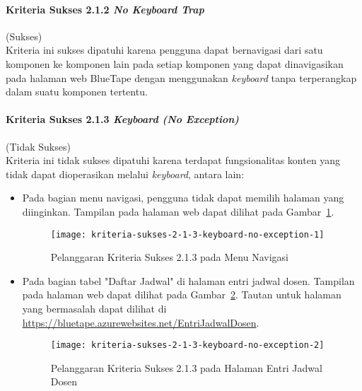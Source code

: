 \paragraph{Kriteria Sukses 2.1.2 \textit{No Keyboard Trap}}
\label{par:kepatuhan_bluetape_kriteria_sukses_2.1.2}
(Sukses)\\

Kriteria ini sukses dipatuhi karena pengguna dapat bernavigasi dari satu komponen ke komponen lain pada setiap komponen yang dapat dinavigasikan pada halaman web BlueTape dengan menggunakan \textit{keyboard} tanpa terperangkap dalam suatu komponen tertentu.

\paragraph{Kriteria Sukses 2.1.3 \textit{Keyboard (No Exception)}}
\label{par:kepatuhan_bluetape_kriteria_sukses_2.1.3}
(Tidak Sukses)\\

Kriteria ini tidak sukses dipatuhi karena terdapat fungsionalitas konten yang tidak dapat dioperasikan melalui \textit{keyboard}, antara lain:

\begin{itemize}
    \item Pada bagian menu navigasi, pengguna tidak dapat memilih halaman yang diinginkan. Tampilan pada halaman web dapat dilihat pada \mbox{Gambar \ref{fig:2.1.3_keyboard_no_exception_1}}.
    \begin{figure}[H]
        \centering  
        \texttt{[image: kriteria-sukses-2-1-3-keyboard-no-exception-1]}  
        \caption[Pelanggaran Kriteria Sukses 2.1.3 pada Menu Navigasi]{Pelanggaran Kriteria Sukses 2.1.3 pada Menu Navigasi}
        \label{fig:2.1.3_keyboard_no_exception_1}  
    \end{figure} 

    \item Pada bagian tabel "Daftar Jadwal" di halaman entri jadwal dosen. Tampilan pada halaman web dapat dilihat pada \mbox{Gambar \ref{fig:2.1.3_keyboard_no_exception_2}}. Tautan untuk halaman yang bermasalah dapat dilihat di \url{https://bluetape.azurewebsites.net/EntriJadwalDosen}.
    \begin{figure}[H]
        \centering  
        \texttt{[image: kriteria-sukses-2-1-3-keyboard-no-exception-2]}  
        \caption[Pelanggaran Kriteria Sukses 2.1.3 pada Halaman Entri Jadwal Dosen]{Pelanggaran Kriteria Sukses 2.1.3 pada Halaman Entri Jadwal Dosen}
        \label{fig:2.1.3_keyboard_no_exception_2}  
    \end{figure} 
\end{itemize}

